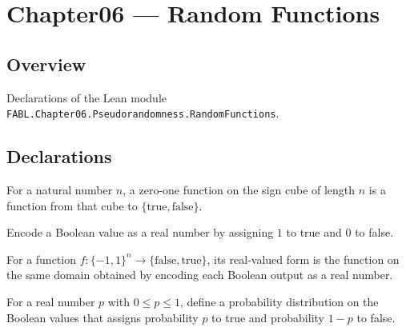 \chapter{Chapter06 — Random Functions}
\section{Overview}

Declarations of the Lean module \texttt{FABL.Chapter06.Pseudorandomness.RandomFunctions}.

\section{Declarations}

\begin{definition}
\label{FABL.ZeroOneFunction}
\leanok
For a natural number $n$, a zero-one function on the sign cube of length $n$ is a
function from that cube to $\{\text{true},\text{false}\}$.
\end{definition}

\begin{definition}
\label{FABL.zeroOneValue}
\leanok
Encode a Boolean value as a real number by assigning $1$ to true and $0$ to false.
\end{definition}

\begin{definition}
\label{FABL.ZeroOneFunction.toReal}
\leanok
{}
For a function $f:\{−1,1\}^n\to\{\mathrm{false},\mathrm{true}\}$, its real-valued form
is the function on the same domain obtained by encoding each Boolean output as a real
number.
\end{definition}

\begin{definition}
\label{FABL.pBiasedBitPMF}
\leanok
For a real number $p$ with $0\le p\le 1$, define a probability distribution on the
Boolean values that assigns probability $p$ to true and probability $1-p$ to false.
\end{definition}

